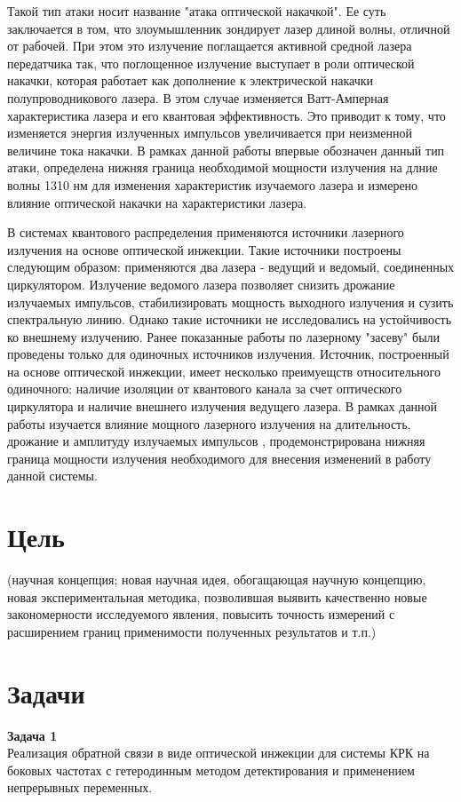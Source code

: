 Такой тип атаки носит название "атака оптической накачкой". Ее суть заключается в том, что злоумышленник зондирует лазер длиной волны, отличной от рабочей. При этом это излучение поглащается активной средной лазера передатчика так, что поглощенное излучение выступает в роли оптической накачки, которая работает как дополнение к электрической накачки полупроводникового лазера. В этом случае изменяется Ватт-Амперная характеристика лазера и его квантовая эффективность. Это приводит к тому, что изменяется энергия излученных импульсов увеличивается при неизменной величине тока накачки. В рамках данной работы впервые обозначен данный тип атаки, определена нижняя граница необходимой мощности излучения на длние волны 1310 нм для изменения характеристик изучаемого лазера и измерено влияние оптической накачки на характеристики лазера. 

В системах квантового распределения применяются  источники лазерного излучения на основе оптической инжекции. Такие источники построены следующим образом: применяются два лазера - ведущий и ведомый, соединенных циркулятором. Излучение ведомого лазера позволяет снизить дрожание излучаемых импульсов, стабилизировать мощность выходного излучения и сузить спектральную линию. Однако такие источники не исследовались на устойчивость ко внешнему излучению. Ранее показанные работы по лазерному "засеву" были проведены только для одиночных источников излучения. Источник, построенный на основе оптической инжекции, имеет несколько преимуещств относительного одиночного: наличие изоляции от квантового канала за счет оптического циркулятора и наличие внешнего излучения ведущего лазера. В рамках данной работы изучается влияние мощного лазерного излучения на длительность, дрожание и амплитуду излучаемых импульсов , продемонстрирована нижняя граница мощности излучения необходимого  для внесения изменений в работу данной системы.
\section*{Цель}
(научная концепция; новая научная идея, обогащающая научную концепцию, новая экспериментальная методика, позволившая выявить качественно новые закономерности исследуемого явления, повысить точность измерений с расширением границ применимости полученных результатов и т.п.)
\section*{Задачи}
\textbf{Задача 1}\\
Реализация обратной связи в виде оптической инжекции для системы КРК на боковых частотах с гетеродинным методом детектирования и применением непрерывных переменных. 

